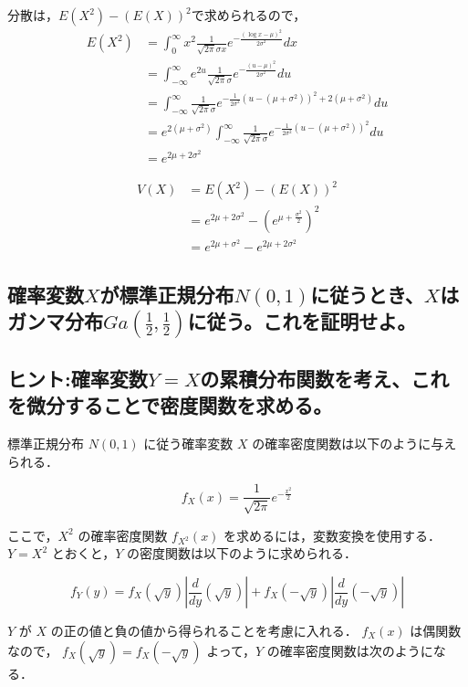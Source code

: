 \documentclass[titlepage,a4paper]{jsarticle}
\begin{document}
分散は，$E(X^2) - (E(X))^2$で求められるので，
\begin{align*}
  E(X^2) & = \int_0^\infty x^2 \frac{1}{\sqrt{2\pi}\sigma x} e^{-\frac{(\log x - \mu)^2}{2\sigma^2}} dx                                                \\
         & = \int_{-\infty}^\infty e^{2u} \frac{1}{\sqrt{2\pi}\sigma} e^{-\frac{(u - \mu)^2}{2\sigma^2}} du                                            \\
         & = \int_{-\infty}^\infty \frac{1}{\sqrt{2\pi}\sigma} e^{-\frac{1}{2\sigma^2} \left( u - (\mu + \sigma^2) \right)^2 + 2(\mu + \sigma^2)} du   \\
         & = e^{2(\mu + \sigma^2)} \int_{-\infty}^\infty \frac{1}{\sqrt{2\pi}\sigma} e^{-\frac{1}{2\sigma^2} \left( u - (\mu + \sigma^2) \right)^2} du \\
         & = e^{2\mu + 2\sigma^2}
\end{align*}

\begin{align*}
  V(X) & = E(X^2) - (E(X))^2                                                    \\
       & = e^{2\mu + 2\sigma^2} - \left( e^{\mu + \frac{\sigma^2}{2}} \right)^2 \\
       & = e^{2\mu + \sigma^2} - e^{2\mu + 2\sigma^2}
\end{align*}

\subsection{確率変数$X$が標準正規分布$N(0, 1)$に従うとき、$X$はガンマ分布$Ga(\frac{1}{2}, \frac{1}{2})$に従う。これを証明せよ。}
\subsection*{ヒント:確率変数$Y = X$の累積分布関数を考え、これを微分することで密度関数を求める。}
標準正規分布 \( N(0,1) \) に従う確率変数 \( X \) の確率密度関数は以下のように与えられる．

\[
  f_X(x) = \frac{1}{\sqrt{2\pi}} e^{-\frac{x^2}{2}}
\]

ここで，\( X^2 \) の確率密度関数 \( f_{X^2}(x) \) を求めるには，変数変換を使用する．
\( Y = X^2 \) とおくと，\( Y \) の密度関数は以下のように求められる．

\[
  f_Y(y) = f_X(\sqrt{y}) \left| \frac{d}{dy}(\sqrt{y}) \right| + f_X(-\sqrt{y}) \left| \frac{d}{dy}(-\sqrt{y}) \right|
\]

\( Y \) が \( X \) の正の値と負の値から得られることを考慮に入れる．
\( f_X(x) \) は偶関数なので，
\( f_X(\sqrt{y}) = f_X(-\sqrt{y}) \) よって，\( Y \) の確率密度関数は次のようになる．
\end{document}

